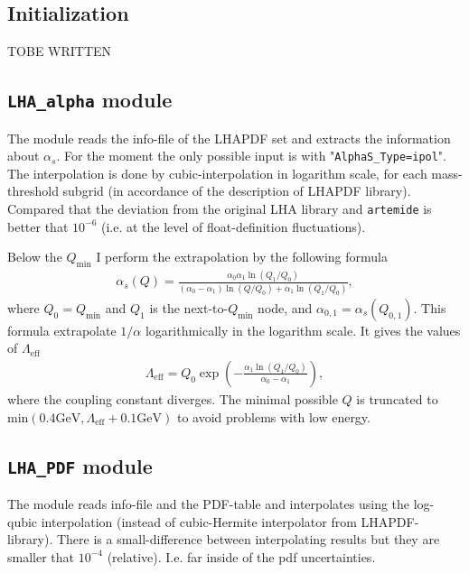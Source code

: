 \documentclass[prd,nofootinbib,eqsecnum,final]{revtex4}
\renewcommand{\(}{\left(}
\renewcommand{\)}{\right)}
\renewcommand{\[}{\left[}
\renewcommand{\]}{\right]}
\newcommand{\red}[1]{{\color[rgb]{1,0,0} #1}}
\begin{document}
\subsection{Initialization}
\label{sec:QCDinput_ini}

\red{TOBE WRITTEN}

\subsection{\texttt{LHA\_alpha} module}

The module reads the info-file of the LHAPDF set and extracts the information about $\alpha_s$. For the moment the only possible input is with "\texttt{AlphaS\_Type=ipol}". The interpolation is done by cubic-interpolation in logarithm scale, for each mass-threshold subgrid (in accordance of the description of LHAPDF library). Compared that the deviation from the original LHA library and \texttt{artemide} is better that $10^{-6}$ (i.e. at the level of float-definition fluctuations).

Below the $Q_{\text{min}}$ I perform the extrapolation by the following formula
\begin{eqnarray}
\alpha_s(Q)=\frac{\alpha_0 \alpha_1 \ln(Q_1/Q_0)}{(\alpha_0-\alpha_1)\ln(Q/Q_0)+\alpha_1\ln(Q_1/Q_0)},
\end{eqnarray}
where $Q_0=Q_{\text{min}}$ and $Q_1$ is the next-to-$Q_{\min}$ node, and $\alpha_{0,1}=\alpha_s(Q_{0,1})$. This formula extrapolate $1/\alpha$ logarithmically in the logarithm scale. It gives the values of $\Lambda_{\text{eff}}$
\begin{eqnarray}
\Lambda_{\text{eff}}=Q_0\exp\(-\frac{\alpha_1 \ln(Q_1/Q_0)}{\alpha_0-\alpha_1}\),
\end{eqnarray}
where the coupling constant diverges. The minimal possible $Q$ is truncated to $\text{min}(0.4\text{GeV},\Lambda_{\text{eff}}+0.1\text{GeV})$ to avoid problems with low energy.

\subsection{\texttt{LHA\_PDF} module}

The module reads info-file and the PDF-table and interpolates using the log-qubic interpolation (instead of cubic-Hermite interpolator from LHAPDF-library). There is a small-difference between interpolating results but they are smaller that $10^{-4}$ (relative). I.e. far inside of the pdf uncertainties. 
\end{document}
